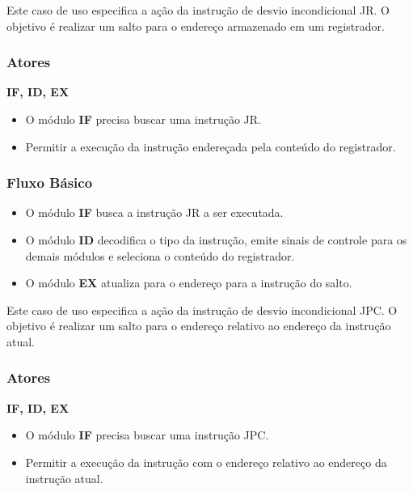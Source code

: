 
Este caso de uso especifica a ação da instrução de desvio incondicional JR. O objetivo é realizar um salto para o endereço armazenado em um registrador.
 
\subsubsection*{Atores}
\textbf{IF, ID, EX}

\preconditions 
\begin{itemize}
 \item O módulo \textbf{IF} precisa buscar uma instrução JR.
\end{itemize}

\postconditions
\begin{itemize}
  \item Permitir a execução da instrução endereçada pela conteúdo do registrador.
\end{itemize}

\subsubsection*{Fluxo Básico}
\begin{itemize}
\item O módulo \textbf{IF} busca a instrução JR a ser executada.
\item O módulo \textbf{ID} decodifica o tipo da instrução, emite sinais de controle para os demais módulos e seleciona o conteúdo do registrador.
\item O módulo \textbf{EX} atualiza para o endereço para a instrução do salto.
\end{itemize}


Este caso de uso especifica a ação da instrução de desvio incondicional JPC. O objetivo é realizar um salto para o endereço relativo ao endereço da instrução atual.
 
\subsubsection*{Atores}
\textbf{IF, ID, EX}

\preconditions 
\begin{itemize}
 \item O módulo \textbf{IF} precisa buscar uma instrução JPC.
\end{itemize}

\postconditions
\begin{itemize}
  \item Permitir a execução da instrução com o endereço relativo ao endereço da instrução atual.
\end{itemize}

